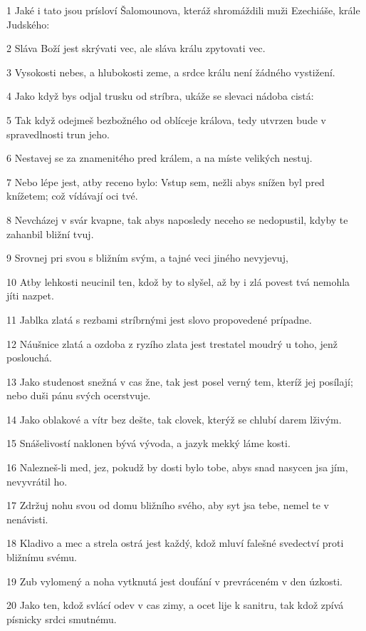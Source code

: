 \par 1 Jaké i tato jsou prísloví Šalomounova, kteráž shromáždili muži Ezechiáše, krále Judského:
\par 2 Sláva Boží jest skrývati vec, ale sláva králu zpytovati vec.
\par 3 Vysokosti nebes, a hlubokosti zeme, a srdce králu není žádného vystižení.
\par 4 Jako když bys odjal trusku od stríbra, ukáže se slevaci nádoba cistá:
\par 5 Tak když odejmeš bezbožného od oblíceje králova, tedy utvrzen bude v spravedlnosti trun jeho.
\par 6 Nestavej se za znamenitého pred králem, a na míste velikých nestuj.
\par 7 Nebo lépe jest, atby receno bylo: Vstup sem, nežli abys snížen byl pred knížetem; což vídávají oci tvé.
\par 8 Nevcházej v svár kvapne, tak abys naposledy neceho se nedopustil, kdyby te zahanbil bližní tvuj.
\par 9 Srovnej pri svou s bližním svým, a tajné veci jiného nevyjevuj,
\par 10 Atby lehkosti neucinil ten, kdož by to slyšel, až by i zlá povest tvá nemohla jíti nazpet.
\par 11 Jablka zlatá s rezbami stríbrnými jest slovo propovedené prípadne.
\par 12 Náušnice zlatá a ozdoba z ryzího zlata jest trestatel moudrý u toho, jenž poslouchá.
\par 13 Jako studenost snežná v cas žne, tak jest posel verný tem, kteríž jej posílají; nebo duši pánu svých ocerstvuje.
\par 14 Jako oblakové a vítr bez dešte, tak clovek, kterýž se chlubí darem lživým.
\par 15 Snášelivostí naklonen bývá vývoda, a jazyk mekký láme kosti.
\par 16 Nalezneš-li med, jez, pokudž by dosti bylo tobe, abys snad nasycen jsa jím, nevyvrátil ho.
\par 17 Zdržuj nohu svou od domu bližního svého, aby syt jsa tebe, nemel te v nenávisti.
\par 18 Kladivo a mec a strela ostrá jest každý, kdož mluví falešné svedectví proti bližnímu svému.
\par 19 Zub vylomený a noha vytknutá jest doufání v prevráceném v den úzkosti.
\par 20 Jako ten, kdož svlácí odev v cas zimy, a ocet lije k sanitru, tak kdož zpívá písnicky srdci smutnému.
